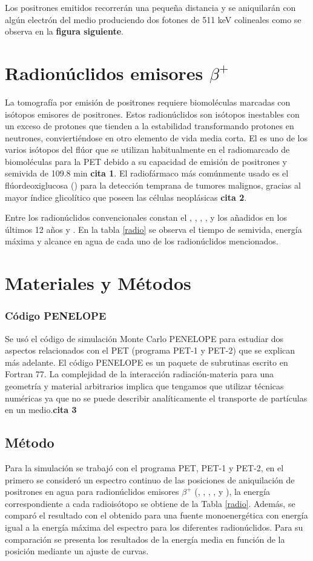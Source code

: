 \documentclass[12pt,a4paper,onecolumn]{article}
\begin{document}
Los positrones  emitidos recorrerán una pequeña distancia y se aniquilarán con algún electrón del medio produciendo dos fotones de 511 keV colineales como se observa en la \textbf{figura siguiente}.
\section{Radionúclidos emisores $\beta^+$}
La tomografía por emisión de positrones requiere biomoléculas marcadas con isótopos emisores de positrones. Estos radionúclidos son isótopos inestables con un exceso de protones que tienden a la estabilidad transformando protones en neutrones, conviertiéndose en otro elemento de vida media corta. El  es uno de los varios isótopos del flúor que se utilizan habitualmente en el radiomarcado de biomoléculas para la PET debido a su capacidad de emisión de positrones y semivida de 109.8 min \textbf{cita 1}. El radiofármaco más comúnmente usado es el flúordeoxiglucosa () para la detección temprana de tumores malignos, gracias al mayor índice glicolítico que poseen las células neoplásicas \textbf{cita 2}.

Entre los radionúclidos convencionales constan el , , , , y los añadidos en los últimos 12 años  y . En la tabla \ref{radio} se observa el tiempo de semivida, energía máxima y alcance en agua de cada uno de los radionúclidos mencionados.

\section{Materiales y Métodos}
\subsubsection*{Código PENELOPE}
Se usó el código de simulación Monte Carlo PENELOPE para estudiar dos aspectos relacionados con el PET (programa PET-1 y PET-2) que se explican más adelante. El código PENELOPE es un paquete de subrutinas escrito en Fortran 77. La complejidad de la interacción radiación-materia para una geometría y material arbitrarios implica que tengamos que utilizar técnicas numéricas ya que no se puede describir analíticamente el transporte de partículas en un medio.\textbf{cita 3}

\subsection*{Método}
Para la simulación se trabajó con el programa PET, PET-1 y PET-2, en el primero se consideró un espectro continuo de las posiciones de aniquilación de positrones en agua para radionúclidos emisores $\beta^+$ (, , , ,  y ), la energía correspondiente a cada radioisótopo se obtiene de la Tabla \ref{radio}. Además, se comparó el resultado con el obtenido para una fuente monoenergética con energía igual a la energía máxima del espectro para los diferentes radionúclidos. Para su comparación se presenta los resultados de la energía media en función de la posición mediante un ajuste de curvas.
  
\end{document}
